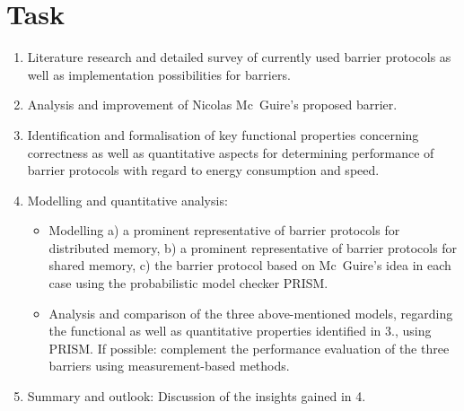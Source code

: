 \documentclass[a4paper, 10pt]{article}
\begin{document}
\section*{Task}
\label{sec:task}
\begin{enumerate}
	\item Literature research and detailed survey of currently used barrier protocols as well as implementation possibilities for barriers.
	\item Analysis and improvement of Nicolas Mc~Guire's proposed barrier.
	\item Identification and formalisation of key functional properties concerning correctness as well as quantitative aspects for determining performance of barrier protocols with regard to energy consumption and speed.
		\item Modelling and quantitative analysis:
			\begin{itemize}
				\item Modelling a) a prominent representative of barrier protocols for distributed memory, b) a prominent representative of barrier protocols for shared memory, c) the barrier protocol based on Mc~Guire's idea in each case using the probabilistic model checker PRISM.
				\item Analysis and comparison of the three above-mentioned models, regarding the functional as well as quantitative properties identified in 3., using PRISM. If possible: complement the performance evaluation of the three barriers using measurement-based methods.
			\end{itemize}
		\item Summary and outlook: Discussion of the insights gained in 4.
\end{enumerate}

\pagebreak
\newpage \thispagestyle{empty} \mbox{}
\pagebreak

\end{document}
